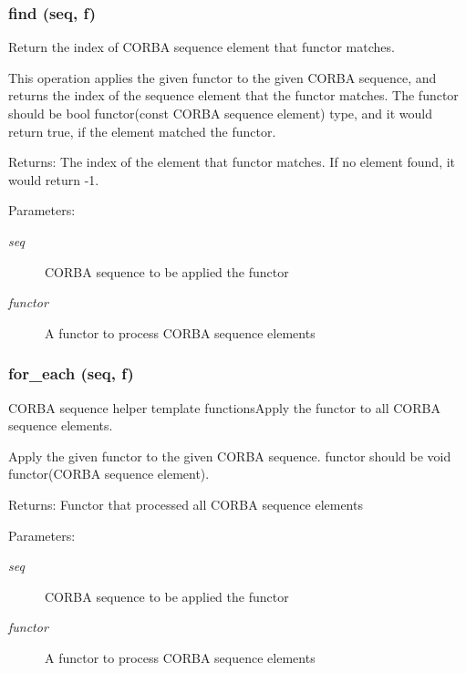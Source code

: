 \subsubsection{\setlength{\rightskip}{0pt plus 5cm}find (seq, f)}\label{CORBA__SeqUtil_8py_a1}


Return the index of CORBA sequence element that functor matches. 

This operation applies the given functor to the given CORBA sequence, and returns the index of the sequence element that the functor matches. The functor should be bool functor(const CORBA sequence element) type, and it would return true, if the element matched the functor.

\begin{Desc}
\item[Returns:]The index of the element that functor matches. If no element found, it would return -1. \end{Desc}
\begin{Desc}
\item[Parameters:]
\begin{description}
\item[{\em seq}]CORBA sequence to be applied the functor \item[{\em functor}]A functor to process CORBA sequence elements\end{description}
\end{Desc}
\subsubsection{\setlength{\rightskip}{0pt plus 5cm}for\_\-each (seq, f)}\label{CORBA__SeqUtil_8py_a0}


CORBA sequence helper template functions\-Apply the functor to all CORBA sequence elements. 

Apply the given functor to the given CORBA sequence. functor should be void functor(CORBA sequence element).

\begin{Desc}
\item[Returns:]Functor that processed all CORBA sequence elements \end{Desc}
\begin{Desc}
\item[Parameters:]
\begin{description}
\item[{\em seq}]CORBA sequence to be applied the functor \item[{\em functor}]A functor to process CORBA sequence elements\end{description}
\end{Desc}
